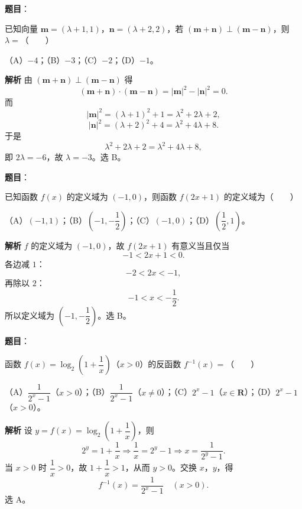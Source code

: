 \begin{answer}

\textbf{题目}：

已知向量 $\boldsymbol m=(\lambda+1,1)$，$\boldsymbol n=(\lambda+2,2)$，若 $(\boldsymbol m+\boldsymbol n)\perp(\boldsymbol m-\boldsymbol n)$，则 $\lambda=$\mbox{（　　）}

（A）$-4$；（B）$-3$；（C）$-2$；（D）$-1$。

\textbf{解析}
由 $(\boldsymbol m+\boldsymbol n)\perp(\boldsymbol m-\boldsymbol n)$ 得
\nopagebreak[4]
\[(\boldsymbol m+\boldsymbol n)\cdot(\boldsymbol m-\boldsymbol n)
=|\boldsymbol m|^2-|\boldsymbol n|^2=0.\]
而
\nopagebreak[4]
\[|\boldsymbol m|^2=(\lambda+1)^2+1=\lambda^2+2\lambda+2,\]
\nopagebreak[4]
\[|\boldsymbol n|^2=(\lambda+2)^2+4=\lambda^2+4\lambda+8.\]
于是
\nopagebreak[4]
\[\lambda^2+2\lambda+2=\lambda^2+4\lambda+8,\]
即 $2\lambda=-6$，故 $\lambda=-3$。选 B。


\end{answer}
\begin{answer}

\textbf{题目}：

已知函数 $f(x)$ 的定义域为 $(-1,0)$，则函数 $f(2x+1)$ 的定义域为\mbox{（　　）}

（A）$(-1,1)$；（B）$\left(-1,-\dfrac12\right)$；（C）$(-1,0)$；（D）$\left(\dfrac12,1\right)$。

\textbf{解析}
$f$ 的定义域为 $(-1,0)$，故 $f(2x+1)$ 有意义当且仅当
\nopagebreak[4]
\[-1<2x+1<0.\]
各边减 $1$：
\nopagebreak[4]
\[-2<2x<-1,\]
再除以 $2$：
\nopagebreak[4]
\[-1<x<-\frac12.\]
所以定义域为 $\left(-1,-\dfrac12\right)$。选 B。


\end{answer}
\begin{answer}

\textbf{题目}：

函数 $f(x)=\log_2\left(1+\dfrac1x\right)$（$x>0$）的反函数 $f^{-1}(x)=$\mbox{（　　）}

（A）$\dfrac1{2^x-1}$（$x>0$）；（B）$\dfrac1{2^x-1}$（$x\neq0$）；（C）$2^x-1$（$x\in\mathbf R$）；（D）$2^x-1$（$x>0$）。

\textbf{解析}
设 $y=f(x)=\log_2\left(1+\dfrac1x\right)$，则
\nopagebreak[4]
\[2^y=1+\frac1x
\Longrightarrow \frac1x=2^y-1
\Longrightarrow x=\frac1{2^y-1}.\]
当 $x>0$ 时 $\dfrac1x>0$，故 $1+\dfrac1x>1$，从而 $y>0$。交换 $x$，$y$，得
\nopagebreak[4]
\[f^{-1}(x)=\frac1{2^x-1}\quad(x>0).\]
选 A。


\end{answer}
